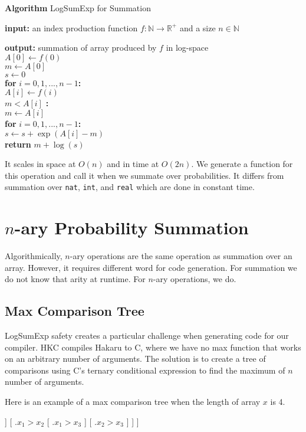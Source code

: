 \documentclass[12pt]{article}
\newcommand{\ind}{\hspace*{1em}}
\newcommand{\kword}[1]{{\bf #1}}
\newcommand{\algblk}[2]{
  \begin{center}
    \begin{minipage}[c]{22em}
      \begin{algorithm}[H]
        \caption*{{\bf Algorithm} #1}
        #2
      \end{algorithm}
    \end{minipage}
  \end{center}
}
\begin{document}
\algblk{LogSumExp for Summation}
{
  \kword{input:} an index production function
  $f : \mathbb{N} \rightarrow \mathbb{R}^+$ and a size $n \in \mathbb{N}$

  \kword{output:} summation of array produced by $f$ in log-space\\

  $A[0] \leftarrow f(0)$\\
  $m \leftarrow A[0]$\\
  $s \leftarrow 0$\\
  \kword{for} $i = 0,1,...,n-1$\kword{:}\\
  \ind $A[i] \leftarrow f(i)$\\
  \ind \kword{if} $m < A[i]$ \kword{:}\\
  \ind \ind $m \leftarrow A[i]$\\
  \kword{for} $i = 0,1,...,n-1$\kword{:}\\
  \ind \ind $s \leftarrow s + \exp(A[i]-m)$\\
  \kword{return} $m + \log(s)$
}

It scales in space at $O(n)$ and in time at $O(2n)$. We generate a function
for this operation and call it when we summate over probabilities. It differs
from summation over {\tt nat}, {\tt int}, and {\tt real} which are done in
constant time.

\section{$n$-ary Probability Summation}

Algorithmically, $n$-ary operations are the same operation as summation over an
array. However, it requires different word for code generation. For summation
we do not know that arity at runtime. For $n$-ary operations, we do.


\subsection*{Max Comparison Tree}
LogSumExp safety creates a particular challenge when generating code for our
compiler. HKC compiles Hakaru to C, where we have no max function that works
on an arbitrary number of arguments. The solution is to create a tree of
comparisons using C's ternary conditional expression to find the maximum of $n$
number of arguments.

Here is an example of a max comparison tree when the length of array $x$ is
4.

\begin{center}
\Tree [ .{$x_0 > x_1$}
        [ .{$x_0 > x_2$}
          [ .{$x_0 > x_3$}
          ]
          [ .{$x_2 > x_3$}
          ]
        ]
        [ .{$x_1 > x_2$}
          [ .{$x_1 > x_3$}
          ]
          [ .{$x_2 > x_3$}
          ]
        ]
      ]
\end{center}
\end{document}
